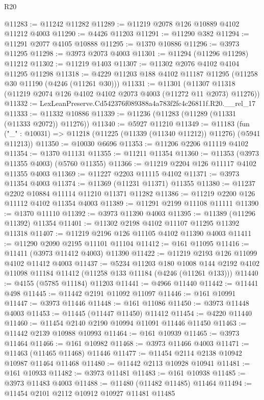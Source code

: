 \begin{lexlean}{R20}
\begin{coremodule}
@11283 := @11242 @11282
@11289 := @11219 @2078 @126 @10889 @4102 @11212 @4003
@11290 := @4426 @11203
@11291 := @11290 @382
@11294 := @11291 @2077 @4105 @10888
@11295 := @1370 @10886
@11296 := @3973 @11295
@11298 := @3973 @2073 @4003
@11301 := @11294 (@11296 @11298) @11212
@11302 := @11219 @1403
@11307 := @11302 @2076 @4102 @4104 @11295 @11298
@11318 := @4229 @11203 @188 @4102 @11187 @11295 (@11258 @30 @11190 (@4246 (@11261 @30)))
@11331 := @11301
    (@11307 @11318 (@11219 @2074 @126 @4102 @4102 @2073 @4003 (@11272 @11 @2073) @11276))
@11332 := LexLeanPreserve.Cd542376f089388a4a783f2fc4c26811f.R20.__rel_17
@11333 := @11332 @10886
@11339 := @11236 (@11283 (@11289 (@11331 (@11333 @2072)) @11276))
@11340 := @5927 @11210
@11349 := @11183
    (fun ("_" : @10031) => @11218 (@11225 (@11339 (@11340 @11212)) @11276) (@5941 @11213))
@11350 := @10030 @6696
@11353 := @11206 @2206 @11119 @4102
@11354 := @1370 @11131
@11355 := @11211 @11354
@11360 := @11353 (@3973 @11355 @4003) (@5760 @11355)
@11366 := @11219 @2204 @126 @11117 @4102 @11355 @4003
@11369 := @11227 @2203 @11115 @4102
@11371 := @3973 @11354 @4003
@11374 := @11369 (@11231 @11371) @11355
@11380 := @11237 @2202 @10884 @11114 @11210 @11371 @11282
@11386 := @11219 @2200 @126 @11112 @4102 @11354 @4003
@11389 := @11291 @2199 @11108 @11111
@11390 := @1370 @11110
@11392 := @3973 @11390 @4003
@11395 := @11389 (@11296 @11392) @11354
@11401 := @11302 @2198 @4102 @11107 @11295 @11392 @11318
@11407 := @11219 @2196 @126 @11105 @4102 @11390 @4003
@11411 := @11290 @2090 @2195 @11101 @11104
@11412 := @161 @11095
@11416 := @11411 (@3973 @11412 @4003) @11390
@11422 := @11219 @2193 @126 @11099 @4102 @11412 @4003
@11437 := @5234
    @11203
    @180
    @1008
    @144
    @2192
    @4102
    @11098
    @11184
    @11412
    (@11258 @133 @11184 (@4246 (@11261 @133)))
@11440 := @4155 (@5785 @11184) @11203
@11441 := @4966 @11440
@11442 := @11441 @498
@11445 := @11442 @2191 @11092 @11097
@11446 := @161 @10991
@11447 := @3973 @11446
@11448 := @161 @11086
@11450 := @3973 @11448 @4003
@11453 := @11445 (@11447 @11450) @11412
@11454 := @4220 @11440
@11460 := @11454 @2140 @2190 @10994 @11091 @11446 @11450
@11463 := @11442 @2139 @10988 @10993
@11464 := @161 @10939
@11465 := @3973 @11464
@11466 := @161 @10982
@11468 := @3973 @11466 @4003
@11471 := @11463 (@11465 @11468) @11446
@11477 := @11454 @2114 @2138 @10942 @10987 @11464 @11468
@11480 := @11442 @2113 @10928 @10941
@11481 := @161 @10933
@11482 := @3973 @11481
@11483 := @161 @10938
@11485 := @3973 @11483 @4003
@11488 := @11480 (@11482 @11485) @11464
@11494 := @11454 @2101 @2112 @10912 @10927 @11481 @11485

\end{coremodule}
\end{lexlean}
